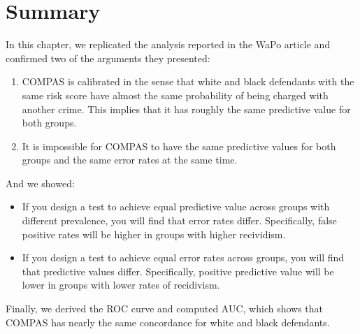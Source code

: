 \hypertarget{summary}{%
\section{Summary}\label{summary}}

In this chapter, we replicated the analysis reported in the WaPo article
and confirmed two of the arguments they presented:

\begin{enumerate}
\def\labelenumi{\arabic{enumi}.}
\item
  COMPAS is calibrated in the sense that white and black defendants with
  the same risk score have almost the same probability of being charged
  with another crime. This implies that it has roughly the same
  predictive value for both groups.
\item
  It is impossible for COMPAS to have the same predictive values for
  both groups and the same error rates at the same time.
\end{enumerate}

And we showed:

\begin{itemize}
\item
  If you design a test to achieve equal predictive value across groups
  with different prevalence, you will find that error rates differ.
  Specifically, false positive rates will be higher in groups with
  higher recividism.
\item
  If you design a test to achieve equal error rates across groups, you
  will find that predictive values differ. Specifically, positive
  predictive value will be lower in groups with lower rates of
  recidivism.
\end{itemize}

Finally, we derived the ROC curve and computed AUC, which shows that
COMPAS has nearly the same concordance for white and black defendants.

